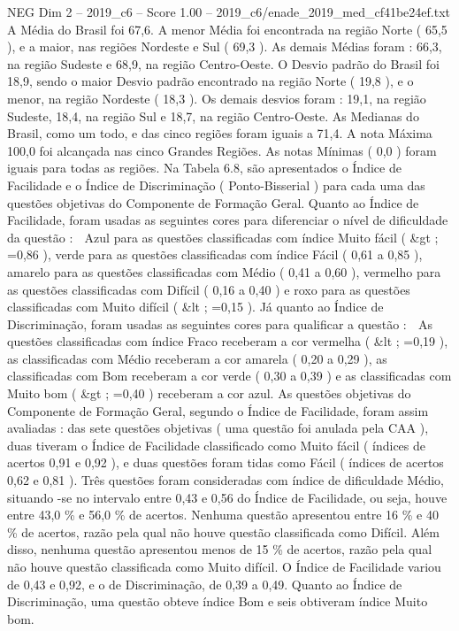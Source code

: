 \begin{textsample}{NEG Dim 2 – 2019\_c6 – Score 1.00 – 2019\_c6/enade\_2019\_med\_cf41be24ef.txt}
A Média do Brasil foi 67,6.
A menor Média foi encontrada na região Norte ( 65,5 ), e a maior, nas regiões Nordeste e Sul ( 69,3 ).
As demais Médias foram : 66,3, na região Sudeste e 68,9, na região Centro-Oeste.
O Desvio padrão do Brasil foi 18,9, sendo o maior Desvio padrão encontrado na região Norte ( 19,8 ), e o menor, na região Nordeste ( 18,3 ).
Os demais desvios foram : 19,1, na região Sudeste, 18,4, na região Sul e 18,7, na região Centro-Oeste.
As Medianas do Brasil, como um todo, e das cinco regiões foram iguais a 71,4.
A nota Máxima 100,0 foi alcançada nas cinco Grandes Regiões.
As notas Mínimas ( 0,0 ) foram iguais para todas as regiões.
Na Tabela 6.8, são apresentados o Índice de Facilidade e o Índice de Discriminação ( Ponto-Bisserial ) para cada uma das questões objetivas do Componente de Formação Geral.
Quanto ao Índice de Facilidade, foram usadas as seguintes cores para diferenciar o nível de dificuldade da questão :  Azul para as questões classificadas com índice Muito fácil ( \&gt ; =0,86 ), verde para as questões classificadas com índice Fácil ( 0,61 a 0,85 ), amarelo para as questões classificadas com Médio ( 0,41 a 0,60 ), vermelho para as questões classificadas com Difícil ( 0,16 a 0,40 ) e roxo para as questões classificadas com Muito difícil ( \&lt ; =0,15 ).
Já quanto ao Índice de Discriminação, foram usadas as seguintes cores para qualificar a questão :  As questões classificadas com índice Fraco receberam a cor vermelha ( \&lt ; =0,19 ), as classificadas com Médio receberam a cor amarela ( 0,20 a 0,29 ), as classificadas com Bom receberam a cor verde ( 0,30 a 0,39 ) e as classificadas com Muito bom ( \&gt ; =0,40 ) receberam a cor azul.
As questões objetivas do Componente de Formação Geral, segundo o Índice de Facilidade, foram assim avaliadas : das sete questões objetivas ( uma questão foi anulada pela CAA ), duas tiveram o Índice de Facilidade classificado como Muito fácil ( índices de acertos 0,91 e 0,92 ), e duas questões foram tidas como Fácil ( índices de acertos 0,62 e 0,81 ).
Três questões foram consideradas com índice de dificuldade Médio, situando -se no intervalo entre 0,43 e 0,56 do Índice de Facilidade, ou seja, houve entre 43,0 \% e 56,0 \% de acertos.
Nenhuma questão apresentou entre 16 \% e 40 \% de acertos, razão pela qual não houve questão classificada como Difícil.
Além disso, nenhuma questão apresentou menos de 15 \% de acertos, razão pela qual não houve questão classificada como Muito difícil.
O Índice de Facilidade variou de 0,43 e 0,92, e o de Discriminação, de 0,39 a 0,49.
Quanto ao Índice de Discriminação, uma questão obteve índice Bom e seis obtiveram índice Muito bom.

\end{textsample}
